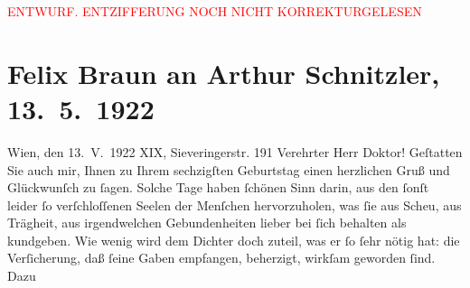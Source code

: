 
\begin{center}
            \textcolor{red}{ENTWURF. ENTZIFFERUNG NOCH NICHT KORREKTURGELESEN}
                      \end{center}
            
               \section[Felix Braun an Arthur Schnitzler, 13. 5. 1922]{ Felix Braun an Arthur Schnitzler, 13. 5. 1922}\nopagebreak{}\rehead{ }\begin{ledgroupsized}[t]{13cm}\normalsize\beginnumbering{} \toendnotes[C]{\smallbreak\pagebreak[2]} 
\toendnotes[C]{\smallbreak}\pstart
           \raggedleft{}{\pb}Wien, den 13. V. 1922\pend
           \pstart
           \raggedleft{}XIX, Sieveringerstr. 191\pend
           \pstart{}Verehrter Herr Doktor!\pend\pstart
           Geſtatten Sie auch mir, Ihnen zu Ihrem sechzigſten Geburtstag einen herzlichen
                    Gruß und Glückwunſch zu ſagen. Solche Tage haben \label{T_L02381_1v}\label{T_L02381_1h} ſchönen Sinn darin, aus den ſonſt leider
                    ſo verſchloſſenen Seelen der Menſchen hervorzuholen, was ſie aus Scheu, aus
                    Trägheit, aus irgendwelchen Gebundenheiten lieber bei ſich behalten als
                    kundgeben. Wie wenig wird dem Dichter doch zuteil, was er ſo ſehr nötig hat: die
                    Verſicherung, daß ſeine Gaben empfangen, beherzigt, wirkſam geworden ſind. Dazu

\end{ledgroupsized}
